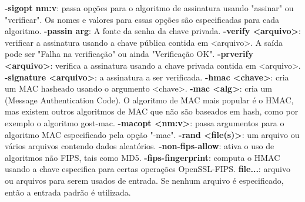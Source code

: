 \documentclass[a4paper,11pt]{article}
\theoremstyle{mytheor}
\begin{document}
\newline\newline
\noindent \textbf{-sigopt nm:v}: passa opções para o algoritmo de assinatura usando "assinar" ou "verificar". Os nomes e valores para essas opções são especificadas para cada algoritmo.
\newline\newline
\noindent \textbf{-passin arg}: A fonte da senha da chave privada.
\newline\newline
\noindent \textbf{-verify <arquivo>}: verificar a assinatura usando a chave pública contida em <arquivo>. A saída pode ser "Falha na verificação" ou ainda "Verificação OK".
\newline\newline
\noindent \textbf{-prverify <arquivo>}: verifica a assinatura usando a chave privada contida em <arquivo>.
\newline\newline
\noindent \textbf{-signature <arquivo>}: a assinatura a ser verificada.
\newline\newline
\noindent \textbf{-hmac <chave>}: cria um MAC hasheado usando o argumento <chave>.
\newline\newline
\noindent \textbf{-mac <alg>}: cria um (Message Authentication Code). O algoritmo de MAC mais popular é o HMAC, mas existem outros algoritmos de MAC que não são baseados em hash, como por exemplo o algoritmo gost-mac. 
\newline\newline
\noindent \textbf{-macopt <nm:v>}: passa argumentos para o algoritmo MAC especificado pela opção "-mac".
\newline\newline
\noindent \textbf{-rand <file(s)>}: um arquivo ou vários arquivos contendo dados aleatórios.
\newline\newline
\noindent \textbf{-non-fips-allow}: ativa o uso de algoritmos não FIPS, tais como MD5.
\newline\newline
\noindent \textbf{-fips-fingerprint}: computa o HMAC usando a chave especifica para certas operações OpenSSL-FIPS.
\newline\newline
\noindent \textbf{file...}: arquivo ou arquivos para serem usados de entrada. Se nenhum arquivo é especificado, então a entrada padrão é utilizada.
\newline
\end{document}
